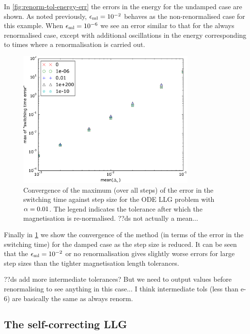 In \cref{fig:renorm-tol-energy-err} the errors in the energy for the undamped case are shown.
As noted previously, $\epsilon_{\mathrm{ml}}= 10^{-2}$ behaves as the non-renormalised case for this example.
When $\epsilon_{\mathrm{ml}} = 10^{-6}$ we see an error similar to that for the always renormalised case, except with additional oscillations in the energy corresponding to times where a renormalisation is carried out.


\begin{figure}
  \centering
  \includegraphics[width=0.8\textwidth]{plots/tolrenorm_llg_ode_convergence/maxofswitchingtimeerrorvsmeanofdts}
  \caption{
    Convergence of the maximum (over all steps) of the error in the switching time
    against step size
    for the ODE LLG problem with
    $\alpha = 0.01$.
    The legend indicates the tolerance after which the magnetisation is re-normalised.
    ??ds not actually a mean...
  }
  \label{fig:tol-renorm-convergence}
\end{figure}

Finally in \cref{fig:tol-renorm-convergence} we show the convergence of the method (in terms of the error in the switching time) for the damped case as the step size is reduced.
It can be seen that the $\epsilon_{\mathrm{ml}}=10^{-2}$ or no renormalisation gives slightly worse errors for large step sizes than the tighter magnetisation length tolerances.

??ds add more intermediate tolerances? But we need to output values before renormalising to see anything in this case... I think intermediate tols (less than e-6) are basically the same as always renorm.


\subsection{The self-correcting LLG}
\label{sec:self-correcting-llg-results}

